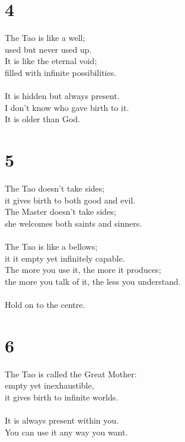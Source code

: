 \documentclass[b5paper, 12pt, oneside]{book}
\begin{document}
\chapter*{4}
The Tao is like a well;\\
used but never used up.\\
It is like the eternal void;\\
filled with infinite possibilities.\\
\\
It is hidden but always present.\\
I don't know who gave birth to it.\\
It is older than God.\\

\chapter*{5}
The Tao doesn't take sides;\\
it gives birth to both good and evil.\\
The Master doesn't take sides;\\
she welcomes both saints and sinners.\\
\\
The Tao is like a bellows;\\
it it empty yet infinitely capable.\\
The more you use it, the more it produces;\\
the more you talk of it, the less you understand.\\
\\
Hold on to the centre.\\

\chapter*{6}
The Tao is called the Great Mother:\\
empty yet inexhaustible,\\
it gives birth to infinite worlds.\\
\\
It is always present within you.\\
You can use it any way you want.\\
\end{document}
